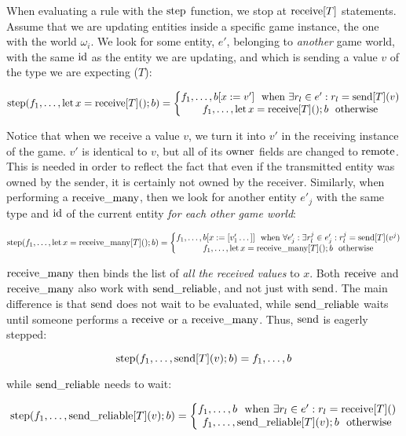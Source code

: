 When evaluating a rule with the $\operatorname{step}$ function, we stop at $\operatorname{receive}[T]$ statements. Assume that we are updating entities inside a specific game instance, the one with the world $\omega_i$. We look for some entity, $e'$, belonging to \textit{another} game world, with the same $\operatorname{id}$ as the entity we are updating, and which is sending a value $v$ of the type we are expecting ($T$):

$$\operatorname{step}(f_1, \dots, \operatorname{let} x = \operatorname{receive}[T](); b) =
\left\{
\begin{matrix}
f_1, \dots, b[x:=v'] \ \ \text{when } \exists r_l \in e' : r_l = \operatorname{send}[T](v) \\
f_1, \dots, \operatorname{let} x = \operatorname{receive}[T](); b \ \ \text{otherwise}
\end{matrix}
\right.
$$

Notice that when we receive a value $v$, we turn it into $v'$ in the receiving instance of the game. $v'$ is identical to $v$, but all of its $\operatorname{owner}$ fields are changed to $\operatorname{remote}$. This is needed in order to reflect the fact that even if the transmitted entity was owned by the sender, it is certainly not owned by the receiver. Similarly, when performing a $\operatorname{receive\_many}$, then we look for another entity $e'_j$ with the same type and $\operatorname{id}$ of the current entity \textit{for each other game world}:

$$\operatorname{step}(f_1, \dots, \operatorname{let} x = \operatorname{receive\_many}[T](); b) =
\left\{
\begin{matrix}
f_1, \dots, b[x:=[v'_1 \dots ]] \ \ \text{when } \forall e'_j : \exists r^j_l \in e'_j : r^j_l = \operatorname{send}[T](v^j) \\
f_1, \dots, \operatorname{let} x = \operatorname{receive\_many}[T](); b \ \ \text{otherwise}
\end{matrix}
\right.
$$

$\operatorname{receive\_many}$ then binds the list of \textit{all the received values} to $x$. Both $\operatorname{receive}$ and $\operatorname{receive\_many}$ also work with $\operatorname{send\_reliable}$, and not just with $\operatorname{send}$. The main difference is that $\operatorname{send}$ does not wait to be evaluated, while $\operatorname{send\_reliable}$ waits until someone performs a $\operatorname{receive}$ or a $\operatorname{receive\_many}$. Thus, $\operatorname{send}$ is eagerly stepped:

$$\operatorname{step}(f_1, \dots, \operatorname{send}[T](v); b) = f_1, \dots, b$$

while $\operatorname{send\_reliable}$ needs to wait:

$$\operatorname{step}(f_1, \dots, \operatorname{send\_reliable}[T](v); b) =
\left\{
\begin{matrix}
f_1, \dots, b \ \ \text{when } \exists r_l \in e' : r_l = \operatorname{receive}[T]() \\
f_1, \dots, \operatorname{send\_reliable}[T](v); b \ \ \text{otherwise}
\end{matrix}
\right.
$$

